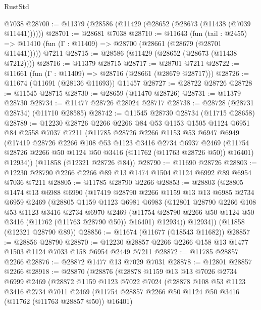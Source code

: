 \begin{lexlean}{RustStd}
\begin{coremodule}
    @7038
@28700 := @11379 (@28586 (@11429 (@28652 (@28673 (@11438 (@7039 @11441))))))
@28701 := @28681 @7038
@28710 := @11643
    (fun (tail : @2455) => @11410 (fun (Γ : @11409) => @28700 (@28661 (@28679 (@28701 @11441)))))
    @7211
@28715 := @28586 (@11429 (@28652 (@28673 (@11438 @7212))))
@28716 := @11379 @28715
@28717 := @28701 @7211
@28722 := @11661 (fun (Γ : @11409) => @28716 (@28661 (@28679 @28717)))
@28726 := @11674 (@11691 (@28136 @11693)) @11457
@28727 := @28722 @28726
@28728 := @11545 @28715
@28730 := @28659 (@11470 @28726)
@28731 := @11379 @28730
@28734 := @11477 @28726 @28024 @28717
@28738 := @28728 (@28731 @28734) (@11710 @28585)
@28742 := @11545 @28730 @28734 (@11715 @28658)
@28789 := @12230
    @28726
    @2266
    @2266
    @84
    @53
    @1153
    @1505
    @1124
    @6951
    @84
    @2558
    @7037
    @7211
    (@11785
      @28726
      @2266
      @1153
      @53
      @6947
      @6949
      (@17419
        @28726
        @2266
        @108
        @53
        @1123
        @3416
        @2734
        @6937
        @2469
        (@11754 @28726 @2266 @50 @1124 @50 @3416 (@11762 (@11763 @28726 @50)) @16401)
        @12934))
    (@11858 (@12321 @28726 @84))
@28790 := @11690 @28726
@28803 := @12230 @28790 @2266 @2266 @89 @13 @1474 @1504 @1124 @6992 @89 @6954 @7036 @7211
@28805 := @11785 @28790 @2266
@28853 := @28803
    (@28805
      @1474
      @13
      @6988
      @6990
      (@17419
        @28790
        @2266
        @1159
        @13
        @13
        @6985
        @2734
        @6959
        @2469
        (@28805
          @1159
          @1123
          @6981
          @6983
          (@12801
            @28790
            @2266
            @108
            @53
            @1123
            @3416
            @2734
            @6970
            @2469
            (@11754 @28790 @2266 @50 @1124 @50 @3416 (@11762 (@11763 @28790 @50)) @16401)
            @12934))
        @12934))
    (@11858 (@12321 @28790 @89))
@28856 := @11674 (@11677 (@18543 @11682))
@28857 := @28856 @28790
@28870 := @12230 @28857 @2266 @2266 @158 @13 @1477 @1503 @1124 @7033 @158 @6954 @2449 @7211
@28872 := @11785 @28857 @2266
@28876 := @28872 @1477 @13 @7029 @7031
@28878 := @12801 @28857 @2266
@28918 := @28870
    (@28876
      (@28878
        @1159
        @13
        @13
        @7026
        @2734
        @6999
        @2469
        (@28872
          @1159
          @1123
          @7022
          @7024
          (@28878
            @108
            @53
            @1123
            @3416
            @2734
            @7011
            @2469
            (@11754 @28857 @2266 @50 @1124 @50 @3416 (@11762 (@11763 @28857 @50)) @16401)

\end{coremodule}
\end{lexlean}
